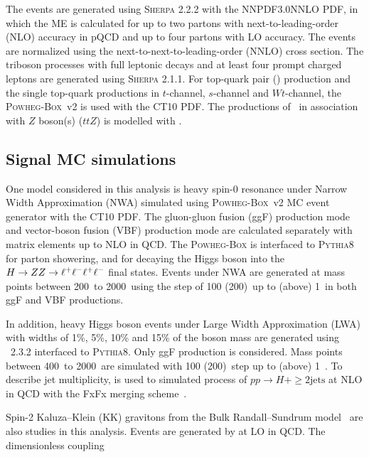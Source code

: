 The \Zjet events are generated using \textsc{Sherpa} 2.2.2 with the NNPDF3.0NNLO PDF,
in which the ME is calculated for up to two partons with next-to-leading-order (NLO) accuracy in pQCD and up to four partons with LO accuracy.
The \Zjet events are normalized using the next-to-next-to-leading-order (NNLO) cross section.
The triboson processes with full leptonic decays and at least four prompt charged leptons are generated using \textsc{Sherpa} 2.1.1.
For top-quark pair (\ttbar) production and the single top-quark productions in $t$-channel, $s$-channel and $Wt$-channel, the \textsc{Powheg-Box}~v2 is used with the CT10 PDF.
The productions of \ttbar~in association with $Z$ boson(s) ($ttZ$) is modelled with \MGMCatNLO.

\subsection{Signal MC simulations}

One model considered in this analysis is heavy spin-0 resonance under Narrow Width Approximation (NWA) simulated using \textsc{Powheg-Box}~v2 MC event generator with the CT10 PDF.
The gluon-gluon fusion (ggF) production mode and vector-boson fusion (VBF) production mode are calculated separately with matrix elements up to NLO in QCD.
The \textsc{Powheg-Box} is interfaced to \textsc{Pythia8} for parton showering, and for decaying the Higgs boson into the $H \rightarrow ZZ \rightarrow \ell^+\ell^-\ell^+\ell^-$ final states.
Events under NWA are generated at mass points between 200~\gev to 2000~\gev using the step of 100 (200)~\gev up to (above) 1~\tev in both ggF and VBF productions.

In addition, heavy Higgs boson events under Large Width Approximation (LWA) with widths of 1\%, 5\%, 10\% and 15\% of the boson mass are generated using \MGMCatNLO~2.3.2 interfaced to \textsc{Pythia8}.
Only ggF production is considered.
Mass points between 400~\gev to 2000~\gev are simulated with 100 (200)~\gev step up to (above) 1~\tev.
To describe jet multiplicity, \MGMCatNLO is used to simulated process of $pp\to H + \geq2\text{jets}$ at NLO in QCD with the FxFx merging scheme~\cite{Frederix2012}.

Spin-2 Kaluza–Klein (KK) gravitons from the Bulk Randall–Sundrum model~\cite{Alwall:2011uj,md52014} are also studies in this analysis.
Events are generated by \MGMCatNLO at LO in QCD.
The dimensionless coupling 
